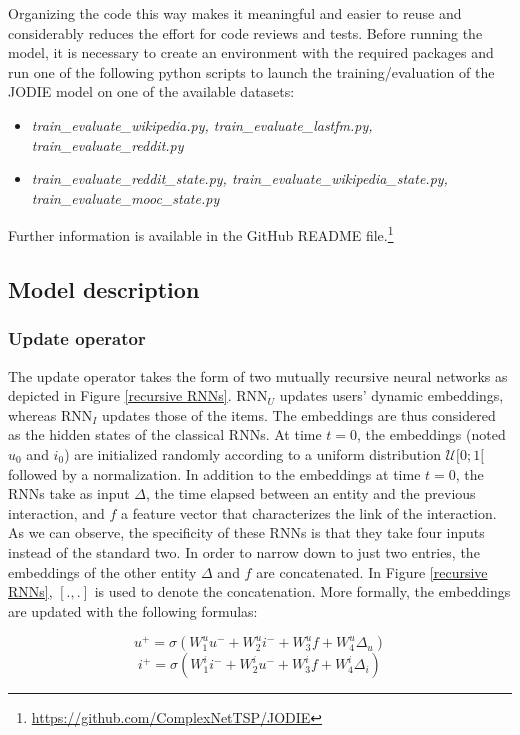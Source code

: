 Organizing the code this way makes it meaningful and easier to reuse and considerably reduces the effort for code reviews and tests. Before running the model, it is necessary to create an environment with the required packages and run one of the following python scripts to launch the training/evaluation of the JODIE model on one of the available datasets:
\begin{itemize}
    \item \textit{train\_evaluate\_wikipedia.py, train\_evaluate\_lastfm.py, train\_evaluate\_reddit.py}
    \item \textit{train\_evaluate\_reddit\_state.py, train\_evaluate\_wikipedia\_state.py, train\_evaluate\_mooc\_state.py}
\end{itemize}
Further information is available in the GitHub README file.\footnote{\url{https://github.com/ComplexNetTSP/JODIE}}

\subsection{Model description}

\subsubsection{Update operator}
The update operator takes the form of two mutually recursive neural networks as depicted in Figure \ref{recursive RNNs}. RNN$_U$ updates users' dynamic embeddings, whereas RNN$_I$ updates those of the items. The embeddings are thus considered as the hidden states of the classical RNNs. At time $t=0$, the embeddings (noted $u_0$ and $i_0$) are initialized randomly according to a uniform distribution $\mathcal{U}[0;1[$ followed by a normalization. In addition to the embeddings at time $t=0$, the RNNs take as input $\Delta$, the time elapsed between an entity and the previous interaction, and $f$ a feature vector that characterizes the link of the interaction. As we can observe, the specificity of these RNNs is that they take four inputs instead of the standard two. In order to narrow down to just two entries, the embeddings of the other entity $\Delta$ and $f$ are concatenated. In Figure \ref{recursive RNNs}, $[.,.]$ is used to denote the concatenation. More formally, the embeddings are updated with the following formulas:

$$
u^+ = \sigma \left ( W_1^u u^- + W_2^u i^- + W_3^u f + W_4^u \Delta_u \right )
$$
$$
i^+ = \sigma \left ( W_1^i i^- + W_2^i u^- + W_3^i f + W_4^i \Delta_i \right )
$$

